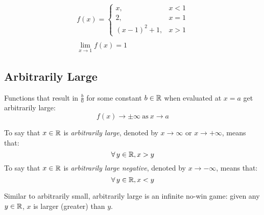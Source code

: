 \documentclass[letterpaper,12pt,fleqn]{article}
\begin{document}
\begin{example}
  \bigskip

  \begin{minipage}{3in}
    \begin{gather*}
      f(x)=\begin{cases}
      x, & x<1 \\
      2, & x=1 \\
      (x-1)^2+1, & x>1
      \end{cases} \\
      \\
      \lim_{x\to1}f(x)=1
    \end{gather*}
  \end{minipage}
  \begin{minipage}{3in}
    \begin{center}
    \end{center}
  \end{minipage}
\end{example}

\newpage

\subsection*{Arbitrarily Large}

Functions that result in \(\frac{b}{0}\) for some constant \(b\in\mathbb{R}\) when evaluated at \(x=a\) get arbitrarily
large:
\[f(x)\to\pm\infty\ \text{as}\ x\to a\]

\begin{definition}
  To say that \(x\in\mathbb{R}\) is \emph{arbitrarily large}, denoted by \(x\to\infty\) or \(x\to+\infty\), means that:
  \[\forall\,y\in\mathbb{R},x>y\]
  To say that \(x\in\mathbb{R}\) is \emph{arbitrarily large negative}, denoted by \(x\to-\infty\), means that:
  \[\forall\,y\in\mathbb{R},x<y\]
\end{definition}

Similar to arbitrarily small, arbitrarily large is an infinite no-win game: given any \(y\in\mathbb{R}\), \(x\) is larger
(greater) than \(y\).
\end{document}
